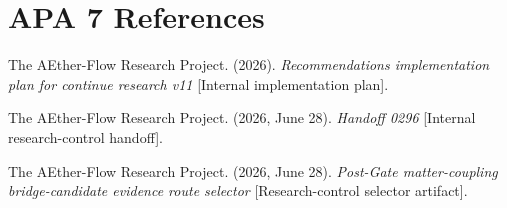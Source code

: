 \documentclass[11pt]{article}
\begin{document}
\section{APA 7 References}

The AEther-Flow Research Project. (2026). \emph{Recommendations implementation
plan for continue research v11} [Internal implementation plan].

The AEther-Flow Research Project. (2026, June 28). \emph{Handoff 0296}
[Internal research-control handoff].

The AEther-Flow Research Project. (2026, June 28). \emph{Post-Gate
matter-coupling bridge-candidate evidence route selector} [Research-control
selector artifact].
\end{document}
